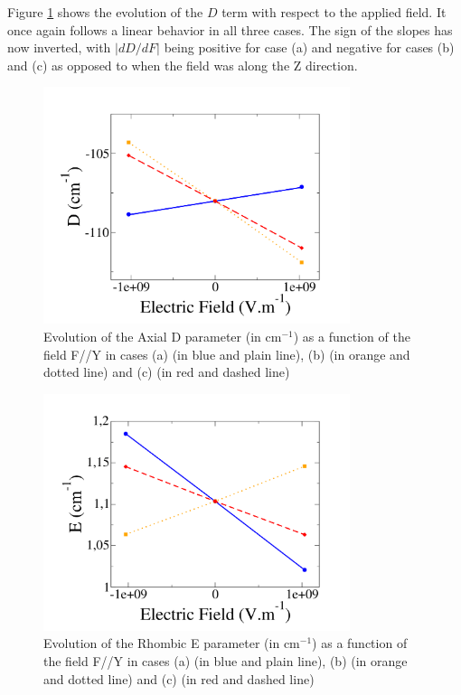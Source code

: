 \documentclass[10pt]{report}
\numberwithin{equation}{section}
\begin{document}
Figure \ref{fig:Ni_D_Y} shows the evolution of the $D$ term with respect to the applied field. It once again follows a linear behavior in all three cases.
The sign of the slopes has now inverted, with $|dD/dF|$ being positive for case (a) and negative for cases (b) and (c) as opposed to when the field was along the Z direction.


\begin{figure}[!ht]
    \centering
    \includegraphics[width=0.8\textwidth]{Images/D_E_Y.png}
    \caption{Evolution of the Axial D parameter (in cm$^{-1}$) as a function of the field F//Y in cases (a) (in blue and plain line), (b) (in orange and dotted line) and (c) (in red and dashed line)}
    \label{fig:Ni_D_Y}
\end{figure}

\begin{figure}[!ht]
    \centering
    \includegraphics[width=0.8\textwidth]{Images/E_E_Y.png}
    \caption{Evolution of the Rhombic E parameter (in cm$^{-1}$) as a function of the field F//Y in cases (a) (in blue and plain line), (b) (in orange and dotted line) and (c) (in red and dashed line)}
    \label{fig:Ni_E_Y}
\end{figure}
\end{document}
